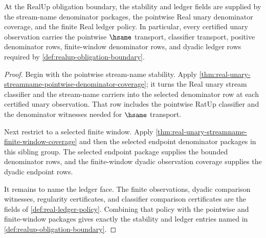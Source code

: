 \begin{theorem}
\label{thm:realup-stability-ledger-obligations}
At the RealUp obligation boundary, the stability and ledger fields are
supplied by the stream-name denominator packages, the pointwise Real unary
denominator coverage, and the finite Real ledger policy. In particular, every
certified unary observation carries the pointwise $\hsame$ transport,
classifier transport, positive denominator rows, finite-window denominator
rows, and dyadic ledger rows required by
\autoref{def:realup-obligation-boundary}.
\end{theorem}
\begin{proof}
Begin with the pointwise stream-name stability. Apply
\autoref{thm:real-unary-streamname-pointwise-denominator-coverage}; it turns
the Real unary stream classifier and the stream-name carriers into the
selected denominator row at each certified unary observation. That row includes
the pointwise RatUp classifier and the denominator witnesses needed for
$\hsame$ transport.

Next restrict to a selected finite window. Apply
\autoref{thm:real-unary-streamname-finite-window-coverage} and then the
selected endpoint denominator packages in this sibling group. The selected
endpoint package supplies the bounded denominator rows, and the finite-window
dyadic observation coverage supplies the dyadic endpoint rows.

It remains to name the ledger face. The finite observations, dyadic comparison
witnesses, regularity certificates, and classifier comparison certificates are
the fields of \autoref{def:real-ledger-policy}. Combining that policy with the
pointwise and finite-window packages gives exactly the stability and ledger
entries named in \autoref{def:realup-obligation-boundary}.
\end{proof}

